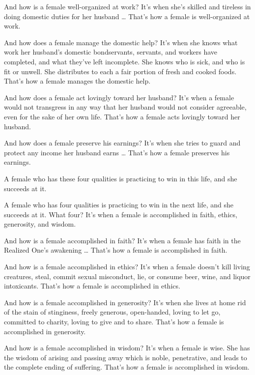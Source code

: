 \documentclass[12pt,openany]{book}%
\begin{document}
And how is a female well-organized at work? It’s when she’s skilled and tireless in doing domestic duties for her husband … That’s how a female is well-organized at work. 

And how does a female manage the domestic help? It’s when she knows what work her husband’s domestic bondservants, servants, and workers have completed, and what they’ve left incomplete. She knows who is sick, and who is fit or unwell. She distributes to each a fair portion of fresh and cooked foods. That’s how a female manages the domestic help. 

And how does a female act lovingly toward her husband? It’s when a female would not transgress in any way that her husband would not consider agreeable, even for the sake of her own life. That’s how a female acts lovingly toward her husband. 

And how does a female preserve his earnings? It’s when she tries to guard and protect any income her husband earns … That’s how a female preserves his earnings. 

A female who has these four qualities is practicing to win in this life, and she succeeds at it. 

A female who has four qualities is practicing to win in the next life, and she succeeds at it. What four? It’s when a female is accomplished in faith, ethics, generosity, and wisdom. 

And how is a female accomplished in faith? It’s when a female has faith in the Realized One’s awakening … That’s how a female is accomplished in faith. 

And how is a female accomplished in ethics? It’s when a female doesn’t kill living creatures, steal, commit sexual misconduct, lie, or consume beer, wine, and liquor intoxicants. That’s how a female is accomplished in ethics. 

And how is a female accomplished in generosity? It’s when she lives at home rid of the stain of stinginess, freely generous, open-handed, loving to let go, committed to charity, loving to give and to share. That’s how a female is accomplished in generosity. 

And how is a female accomplished in wisdom? It’s when a female is wise. She has the wisdom of arising and passing away which is noble, penetrative, and leads to the complete ending of suffering. That’s how a female is accomplished in wisdom. 
\end{document}
